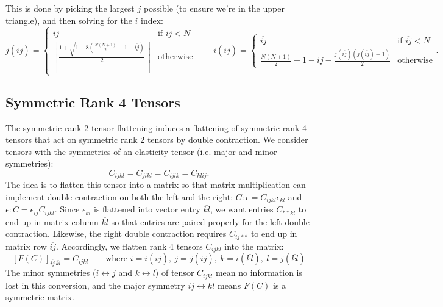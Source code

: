 \documentclass[10pt]{article}
\providecommand{\e}{\epsilon}
\begin{document}
This is done by picking the largest $j$ possible (to ensure we're in the upper
triangle), and then solving for the $i$ index:
$$
j(\overline{ij}) = \begin{cases}
    \overline{ij}  & \text{if } \overline{ij} < N \\
    \left\lfloor \frac{1 + \sqrt{1 + 8 \left(\frac{N (N + 1)}{2} - 1 - \overline{ij} \right)}}{2} \right\rfloor & \text{otherwise}
\end{cases} \quad \quad
i(\overline{ij}) = \begin{cases}
    \overline{ij}  & \text{if } \overline{ij} < N \\
    \frac{N (N + 1)}{2} - 1 - \overline{ij} - \frac{j(\overline{ij}) (j(\overline{ij}) - 1)}{2} & \text{otherwise}
\end{cases}.
$$
\subsection{Symmetric Rank 4 Tensors}
The symmetric rank 2 tensor flattening induces a flattening of symmetric rank 4
tensors that act on symmetric rank 2 tensors by double contraction. We consider
tensors with the symmetries of an elasticity tensor (i.e. major and minor
symmetries):
\begin{equation}
\label{eqn:symmetry}
C_{ijkl} = C_{jikl} = C_{ijlk} = C_{klij}.
\end{equation}
The idea is to flatten this tensor into a matrix so that matrix multiplication
can implement double contraction on both the left and the right: $C : \e =
C_{ijkl} \e_{kl}$ and $\e : C = \e_{ij} C_{ijkl}$. Since $\e_{kl}$ is flattened
into vector entry $\overline{kl}$, we want entries $C_{**kl}$ to end up in
matrix column $\overline{kl}$ so that entries are paired properly for
the left double contraction. Likewise, the right double contraction requires
$C_{ij**}$ to end up in matrix row $\overline{ij}$. Accordingly, we flatten
rank 4 tensors $C_{ijkl}$ into the matrix:
$$ \left[F(C)\right]_{\overline{ij}\,\overline{kl}} = C_{ijkl} \quad \quad \text{where } i = i(\overline{ij}),\ j = j(\overline{ij}),\ k = i(\overline{kl}),\ l = j(\overline{kl})$$
The minor symmetries ($i\leftrightarrow j$ and $k \leftrightarrow l$) of tensor
$C_{ijkl}$ mean no information is lost in this conversion, and
the major symmetry $ij \leftrightarrow kl$ means $F(C)$ is
a symmetric matrix.
\end{document}

